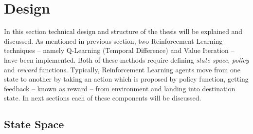 \clearpage
\section{Design}
\label{des:proj}

In this section technical design and structure of the thesis will be explained and discussed. As mentioned in previous section, two Reinforcement Learning techniques -- namely Q-Learning (Temporal Difference) and Value Iteration -- have been implemented. Both of these methods require defining \emph{state space}, \emph{policy} and \emph{reward} functions. Typically, Reinforcement Learning agents move from one state to another by taking an action which is proposed by policy function, getting feedback -- known as reward -- from environment and landing into destination state. In next sections each of these components will be discussed.

\subsection{State Space}
\label{des:state-space}

